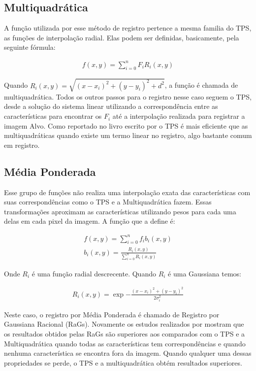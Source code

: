 \subsection{Multiquadrática}
  A função utilizada por esse método de registro pertence a mesma familia do TPS, as funções de interpolação radial.
Elas podem ser definidas, basicamente, pela seguinte fórmula:

\begin{align}\label{math:multiquadric}
    f(x,y) = \sum_{i=0}^n F_i R_i(x,y)
\end{align}

  Quando $R_i(x,y) = \sqrt{(x-x_i)^2 + (y-y_i)^2 + d^2}$, a função é chamada de multiquadrática. Todos os outros passos
para o registro nesse caso seguem o TPS, desde a solução do sistema linear utilizando a correspondência entre as
características para encontrar os $F_i$ até a interpolação realizada para registrar a imagem Alvo. Como reportado
no livro escrito por \cite{goshtasby2005} o TPS é mais eficiente que as multiquadráticas quando existe um termo linear
no registro, algo bastante comum em registro. 

\subsection{Média Ponderada}
  Esse grupo de funções não realiza uma interpolação exata das características com suas correspondências como o TPS e
a Multiquadrática fazem. Essas transformações aproximam as características utilizando pesos para cada uma delas em 
cada pixel da imagem. A função que a define é:

\begin{align}\label{math:multiquadric}
    f(x,y) = \sum_{i=0}^n f_i b_i(x,y) \\
    b_i(x,y) = \frac{R_i(x,y)}{\sum_{i=0}^n R_i(x,y)}
\end{align}

  Onde $R_i$ é uma função radial descrecente. Quando $R_i$ é uma Gaussiana temos:

\begin{align}\label{math:multiquadric}
    R_i(x,y) = \exp{-\frac{(x-x_i)^2 + (y - y_i)^2}{2\sigma_i^2}}
\end{align}

  Neste caso, o registro por Média Ponderada é chamado de Registro por Gaussiana Racional (RaGs). Novamente os estudos
realizados por \cite{goshtasby2005} mostram que os resultados obtidos pelas RaGs são superiores aos comparados com
o TPS e a Multiquadrática quando todas as características tem correspondências e quando nenhuma característica se encontra
fora da imagem. Quando qualquer uma dessas propriedades se perde, o TPS e a multiquadrática obtém resultados superiores.
